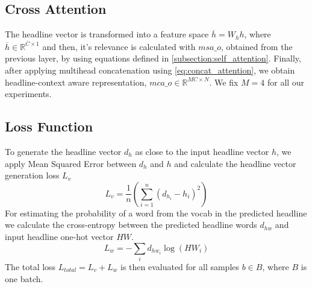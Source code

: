 \documentclass[11pt,a4paper]{article}
\begin{document}
\subsection{Cross Attention}
The headline vector is transformed into a feature space $\overline{h} = W_hh$, where $\overline{h} \in \mathbb{R}^{\overline{C}\times 1}$ and then, it's relevance is calculated with $msa\_o$, obtained from the previous layer, by using equations defined in \ref{subsection:self_attention}. Finally, after applying multihead concatenation using \ref{eq:concat_attention}, we obtain headline-context aware representation, $mca\_o \in \mathbb{R}^{MC \times N}$. We fix $M=4$ for all our experiments.





\subsection{Loss Function}
To generate the headline vector $d_h$ as close to the input headline vector $h$, we apply Mean Squared Error between $d_h$ and $h$ and calculate the headline vector generation loss $L_{v}$
\begin{equation}
    L_{v} = \frac{1}{n}(\sum^{n}_{i=1} (d_{h_{i}} - h_i )^{2})
    \label{eq:mse}
\end{equation}
For estimating the probability of a word from the vocab in the predicted headline we calculate the cross-entropy between the predicted headline words $d_{hw}$ and input headline one-hot vector $HW$.
\begin{equation}
    L_{w}= - \sum_{i} d_{hw_i} \log (HW_{i})
    \label{eq:cce}
\end{equation}
The total loss $L_{total} = L_v + L_w$ is then evaluated for all samples $b \in B$, where $B$ is one batch.
\end{document}
